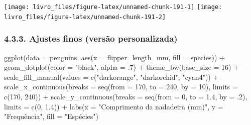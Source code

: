 \documentclass[
]{book}
\newenvironment{Shaded}{\begin{snugshade}}{\end{snugshade}}
\newcommand{\AttributeTok}[1]{\textcolor[rgb]{0.61,0.61,0.61}{#1}}
\newcommand{\DecValTok}[1]{\textcolor[rgb]{0.06,0.06,0.06}{#1}}
\newcommand{\FloatTok}[1]{\textcolor[rgb]{0.06,0.06,0.06}{#1}}
\newcommand{\FunctionTok}[1]{\textcolor[rgb]{0,0,0}{#1}}
\newcommand{\NormalTok}[1]{#1}
\newcommand{\SpecialCharTok}[1]{\textcolor[rgb]{0,0,0}{#1}}
\newcommand{\StringTok}[1]{\textcolor[rgb]{0.5,0.5,0.5}{#1}}
\begin{document}
\begin{center}\texttt{[image: livro\_files/figure-latex/unnamed-chunk-191-1]} \texttt{[image: livro\_files/figure-latex/unnamed-chunk-191-2]} \end{center}

\hypertarget{ajustes-finos-versuxe3o-personalizada-2}{%
\subsubsection{4.3.3. Ajustes finos (versão personalizada)}\label{ajustes-finos-versuxe3o-personalizada-2}}

\begin{Shaded}
\begin{Highlighting}[]
\FunctionTok{ggplot}\NormalTok{(}\AttributeTok{data =}\NormalTok{ penguins, }
       \FunctionTok{aes}\NormalTok{(}\AttributeTok{x =}\NormalTok{ flipper\_length\_mm, }\AttributeTok{fill =}\NormalTok{ species)) }\SpecialCharTok{+}
  \FunctionTok{geom\_dotplot}\NormalTok{(}\AttributeTok{color =} \StringTok{"black"}\NormalTok{, }
               \AttributeTok{alpha =}\NormalTok{ .}\DecValTok{7}\NormalTok{) }\SpecialCharTok{+}
  \FunctionTok{theme\_bw}\NormalTok{(}\AttributeTok{base\_size =} \DecValTok{16}\NormalTok{) }\SpecialCharTok{+}
  \FunctionTok{scale\_fill\_manual}\NormalTok{(}\AttributeTok{values =} \FunctionTok{c}\NormalTok{(}\StringTok{"darkorange"}\NormalTok{, }\StringTok{"darkorchid"}\NormalTok{, }\StringTok{"cyan4"}\NormalTok{)) }\SpecialCharTok{+}
  \FunctionTok{scale\_x\_continuous}\NormalTok{(}\AttributeTok{breaks =} \FunctionTok{seq}\NormalTok{(}\AttributeTok{from =} \DecValTok{170}\NormalTok{, }\AttributeTok{to =} \DecValTok{240}\NormalTok{, }\AttributeTok{by =} \DecValTok{10}\NormalTok{), }\AttributeTok{limits =} \FunctionTok{c}\NormalTok{(}\DecValTok{170}\NormalTok{, }\DecValTok{240}\NormalTok{)) }\SpecialCharTok{+}
  \FunctionTok{scale\_y\_continuous}\NormalTok{(}\AttributeTok{breaks =} \FunctionTok{seq}\NormalTok{(}\AttributeTok{from =} \DecValTok{0}\NormalTok{, }\AttributeTok{to =} \FloatTok{1.4}\NormalTok{, }\AttributeTok{by =}\NormalTok{ .}\DecValTok{2}\NormalTok{), }\AttributeTok{limits =} \FunctionTok{c}\NormalTok{(}\DecValTok{0}\NormalTok{, }\FloatTok{1.4}\NormalTok{)) }\SpecialCharTok{+}
  \FunctionTok{labs}\NormalTok{(}\AttributeTok{x =} \StringTok{"Comprimento da nadadeira (mm)"}\NormalTok{, }\AttributeTok{y =} \StringTok{"Frequência"}\NormalTok{, }\AttributeTok{fill =} \StringTok{"Espécies"}\NormalTok{)}
\end{Highlighting}
\end{Shaded}
\end{document}
